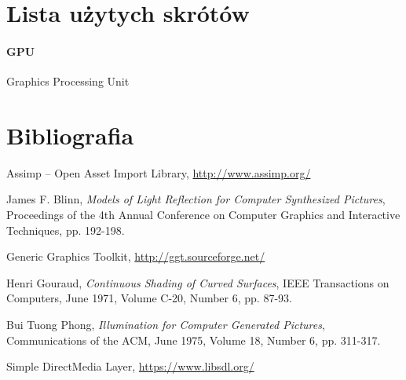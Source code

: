 \documentclass[10pt,a4paper]{article}
\begin{document}

\section{Lista użytych skrótów}

\label{abbr:gpu}
\paragraph{GPU} Graphics Processing Unit

\renewcommand*{\refname}{\vspace*{-2em}}
\section{Bibliografia}
\begin{thebibliography}{99}

	Assimp -- Open Asset Import Library,
	\url{http://www.assimp.org/}

	James F. Blinn,
	\emph{Models of Light Reflection for Computer Synthesized Pictures},
	Proceedings of the 4th Annual Conference on Computer Graphics and Interactive Techniques,
	pp. 192-198.

	Generic Graphics Toolkit,
	\url{http://ggt.sourceforge.net/}
	
	Henri Gouraud,
	\emph{Continuous Shading of Curved Surfaces},
	IEEE Transactions on Computers,
	June 1971, Volume C-20, Number 6,
	pp. 87-93.

	Bui Tuong Phong,
	\emph{Illumination for Computer Generated Pictures},
	Communications of the ACM,
	June 1975, Volume 18, Number 6,
	pp. 311-317.

	Simple DirectMedia Layer,
	\url{https://www.libsdl.org/}
\end{thebibliography}
\end{document}
